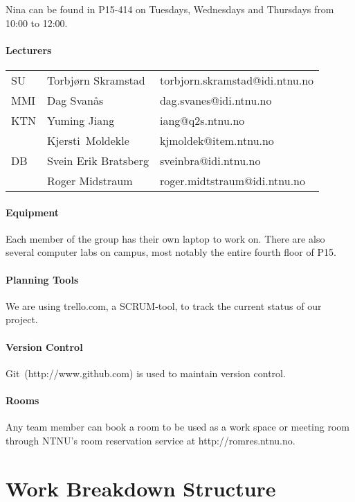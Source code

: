 \documentclass{article}
\begin{document}
Nina can be found in P15-414 on Tuesdays, Wednesdays and Thursdays from
10:00 to 12:00.

\subsection{Lecturers}

\begin{tabular}{lll}
SU & Torbj\o rn Skramstad & torbjorn.skramstad@idi.ntnu.no \\ 
MMI & Dag Svan\aa s & dag.svanes@idi.ntnu.no \\ 
KTN & Yuming Jiang & iang@q2s.ntnu.no \\ 
& Kjersti\ Moldekle & kjmoldek@item.ntnu.no \\ 
DB & Svein Erik Bratsberg & sveinbra@idi.ntnu.no \\ 
& Roger Midstraum & roger.midtstraum@idi.ntnu.no%
\end{tabular}

\subsection{Equipment}

Each member of the group has their own laptop to work on. There are also
several computer labs on campus, most notably the entire fourth floor of P15.

\subsection{Planning Tools}

We are using trello.com, a SCRUM-tool, to track the current status of our
project.

\subsection{Version Control}

Git\ (http://www.github.com) is used to maintain version control.

\subsection{Rooms}

Any team member can book a room to be used as a work space or meeting room
through NTNU's room reservation service at http://romres.ntnu.no.

\newpage

\part{Work Breakdown Structure}
\end{document}
